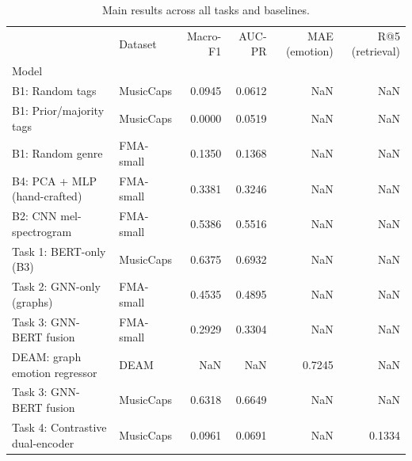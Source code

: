 \begin{table}[t]
\caption{Main results across all tasks and baselines.}
\label{tab:master}
\begin{tabular}{llrrrr}
\toprule
 & Dataset & Macro-F1 & AUC-PR & MAE (emotion) & R@5 (retrieval) \\
Model &  &  &  &  &  \\
\midrule
B1: Random tags & MusicCaps & 0.0945 & 0.0612 & NaN & NaN \\
B1: Prior/majority tags & MusicCaps & 0.0000 & 0.0519 & NaN & NaN \\
B1: Random genre & FMA-small & 0.1350 & 0.1368 & NaN & NaN \\
B4: PCA + MLP (hand-crafted) & FMA-small & 0.3381 & 0.3246 & NaN & NaN \\
B2: CNN mel-spectrogram & FMA-small & 0.5386 & 0.5516 & NaN & NaN \\
Task 1: BERT-only (B3) & MusicCaps & 0.6375 & 0.6932 & NaN & NaN \\
Task 2: GNN-only (graphs) & FMA-small & 0.4535 & 0.4895 & NaN & NaN \\
Task 3: GNN-BERT fusion & FMA-small & 0.2929 & 0.3304 & NaN & NaN \\
DEAM: graph emotion regressor & DEAM & NaN & NaN & 0.7245 & NaN \\
Task 3: GNN-BERT fusion & MusicCaps & 0.6318 & 0.6649 & NaN & NaN \\
Task 4: Contrastive dual-encoder & MusicCaps & 0.0961 & 0.0691 & NaN & 0.1334 \\
\bottomrule
\end{tabular}
\end{table}
